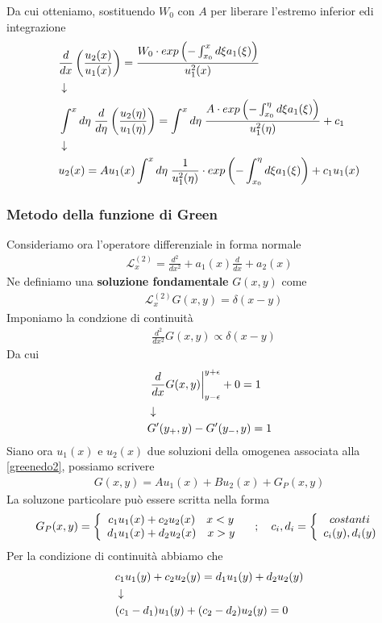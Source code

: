 Da cui otteniamo, sostituendo $W_0$ con $A$ per liberare l'estremo inferior edi integrazione
\begin{align}
&\frac{d}{dx} \left( \frac{u_2(x)}{u_1(x)} \right) = \frac{W_0\cdot exp\left( -\int_{x_0}^{x} d\xi a_1(\xi) \right)}{u_1^2(x)} \\ &\downarrow \nonumber \\
& \int^x d\eta \; \frac{d}{d\eta} \left( \frac{u_2(\eta)}{u_1(\eta)} \right) =\int^x d\eta \; \frac{A \cdot exp\left( -\int_{x_0}^{\eta} d\xi a_1(\xi) \right)}{u_1^2(\eta)} + c_1 \nonumber \\ &\downarrow \nonumber \\
&u_2(x) = Au_1(x) \int^x d\eta \; \frac{1}{u_1^2(\eta)}\cdot exp\left( -\int_{x_0}^{\eta} d\xi a_1(\xi) \right) + c_1u_1(x)
\end{align}


\subsubsection{Metodo della funzione di Green}
Consideriamo ora l'operatore differenziale in forma normale
\begin{align}
	\mathcal{L}_x^{(2)} =\frac{d^2}{dx^2} + a_1(x)\frac{d}{dx} + a_2(x)
\end{align}
Ne definiamo una \textbf{soluzione fondamentale} $G(x,y)$ come
\begin{align}
	&\mathcal{L}_x^{(2)} G(x,y)= \delta(x-y) \label{greenedo2}
\end{align}
Imponiamo la condzione di continuità 
\begin{align}
	&\frac{d^2}{dx^2}G(x,y) \propto \delta(x-y)
\end{align}
Da cui 
\begin{align}
	&\left.\frac{d}{dx}G(x,y) \right|_{y-\epsilon}^{y+\epsilon} + 0 = 1 \\ &\downarrow \nonumber \\
	&G'(y_+,y) - G'(y_-,y) = 1
\end{align}
Siano ora $u_1(x)$ e $u_2(x)$ due soluzioni della omogenea associata alla \ref{greenedo2}, possiamo scrivere
\begin{align}
	G(x,y) = A u_1(x) + B u_2(x) + G_P(x,y)
\end{align}
La soluzone particolare può essere scritta nella forma
\begin{align}
	G_P(x,y) = \left\{ \begin{array}{cc} c_1 u_1 (x) + c_2 u_2 (x) \quad x<y\\ d_1 u_1 (x) + d_2 u_2 (x) \quad x>y \end{array} \right. \quad ; \quad c_i,d_i = \left\{ \begin{array}{cc} costanti\\ c_i(y), d_i(y) \end{array} \right.
\end{align}
Per la condizione di continuità abbiamo che
\begin{align}
	&c_1 u_1 (y) + c_2 u_2 (y) = d_1 u_1 (y) + d_2 u_2 (y)\\ &\downarrow \nonumber \\
	&(c_1 - d_1) u_1 (y) +(c_2 - d_2)u_2 (y) =0
\end{align}
